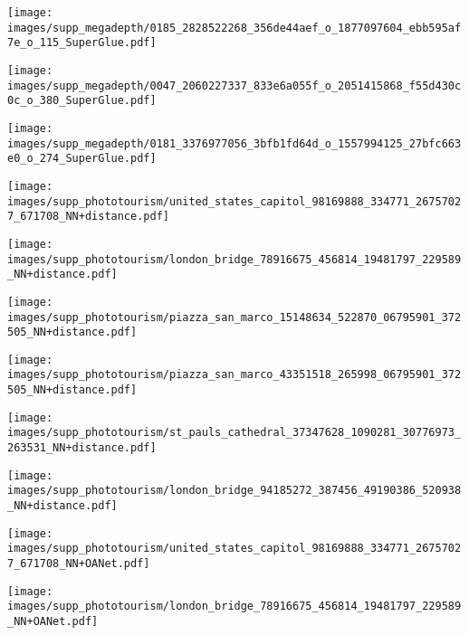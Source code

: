 \documentclass[10pt,twocolumn,letterpaper]{article}
\renewcommand{\*}[1]{\mathbf{#1}}
\newcommand{\0}{\phantom{0}}
\begin{document}
\begin{figure*}[ht!]
\begin{minipage}{\iwidth\textwidth}
    \vspace{.5mm}
    \texttt{[image: images/supp\_megadepth/0185\_2828522268\_356de44aef\_o\_1877097604\_ebb595af7e\_o\_115\_SuperGlue.pdf]}
    
    \vspace{.5mm}
    \texttt{[image: images/supp\_megadepth/0047\_2060227337\_833e6a055f\_o\_2051415868\_f55d430c0c\_o\_380\_SuperGlue.pdf]}
    
    \vspace{.5mm}
    \texttt{[image: images/supp\_megadepth/0181\_3376977056\_3bfb1fd64d\_o\_1557994125\_27bfc663e0\_o\_274\_SuperGlue.pdf]}
\end{minipage}

\begin{minipage}{\iwidth\textwidth}
    \texttt{[image: images/supp\_phototourism/united\_states\_capitol\_98169888\_334771\_26757027\_671708\_NN+distance.pdf]}
    
    \vspace{.5mm}
    \texttt{[image: images/supp\_phototourism/london\_bridge\_78916675\_456814\_19481797\_229589\_NN+distance.pdf]}
    
    \vspace{.5mm}
    \texttt{[image: images/supp\_phototourism/piazza\_san\_marco\_15148634\_522870\_06795901\_372505\_NN+distance.pdf]}
    
    \vspace{.5mm}
    \texttt{[image: images/supp\_phototourism/piazza\_san\_marco\_43351518\_265998\_06795901\_372505\_NN+distance.pdf]}
    
    \vspace{.5mm}
    \texttt{[image: images/supp\_phototourism/st\_pauls\_cathedral\_37347628\_1090281\_30776973\_263531\_NN+distance.pdf]}
    
    \vspace{.5mm}
    \texttt{[image: images/supp\_phototourism/london\_bridge\_94185272\_387456\_49190386\_520938\_NN+distance.pdf]}
\end{minipage}\hspace{1mm}\begin{minipage}{\iwidth\textwidth}
    \texttt{[image: images/supp\_phototourism/united\_states\_capitol\_98169888\_334771\_26757027\_671708\_NN+OANet.pdf]}
    
    \vspace{.5mm}
    \texttt{[image: images/supp\_phototourism/london\_bridge\_78916675\_456814\_19481797\_229589\_NN+OANet.pdf]}
    

\end{minipage}
\end{figure*}
\end{document}
